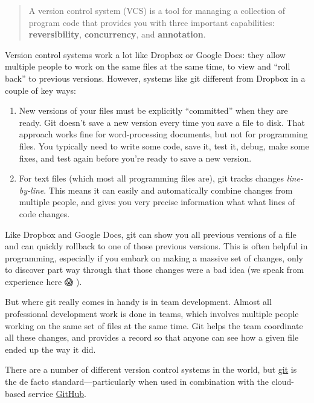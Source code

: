 \documentclass[]{book}
\theoremstyle{definition}
\theoremstyle{definition}
\theoremstyle{remark}
\begin{document}
\begin{quote}
A version control system (VCS) is a tool for managing a collection of
program code that provides you with three important capabilities:
\textbf{reversibility}, \textbf{concurrency}, and \textbf{annotation}.
\end{quote}

Version control systems work a lot like Dropbox or Google Docs: they
allow multiple people to work on the same files at the same time, to
view and ``roll back'' to previous versions. However, systems like git
different from Dropbox in a couple of key ways:

\begin{enumerate}
\def\labelenumi{\arabic{enumi}.}
\item
  New versions of your files must be explicitly ``committed'' when they
  are ready. Git doesn't save a new version every time you save a file
  to disk. That approach works fine for word-processing documents, but
  not for programming files. You typically need to write some code, save
  it, test it, debug, make some fixes, and test again before you're
  ready to save a new version.
\item
  For text files (which most all programming files are), git tracks
  changes \emph{line-by-line}. This means it can easily and
  automatically combine changes from multiple people, and gives you very
  precise information what what lines of code changes.
\end{enumerate}

Like Dropbox and Google Docs, git can show you all previous versions of
a file and can quickly rollback to one of those previous versions. This
is often helpful in programming, especially if you embark on making a
massive set of changes, only to discover part way through that those
changes were a bad idea (we speak from experience here 😱 ).

But where git really comes in handy is in team development. Almost all
professional development work is done in teams, which involves multiple
people working on the same set of files at the same time. Git helps the
team coordinate all these changes, and provides a record so that anyone
can see how a given file ended up the way it did.

There are a number of different version control systems in the world,
but \href{http://git-scm.com/}{git} is the de facto
standard---particularly when used in combination with the cloud-based
service \href{https://github.com/}{GitHub}.
\end{document}
